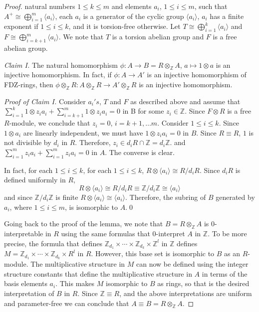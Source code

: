 \documentclass{article}
\theoremstyle{remark}
\def\Z{{\mathbb{Z}}}
\begin{document}
 \begin{proof}
 natural numbers $1\leq k \leq m$ and elements $a_i$, $1\leq i\leq m$, such that $A^+\cong \bigoplus_{i=1}^m \langle a_i\rangle$, each $a_i$ is a generator of the cyclic group $\langle a_i\rangle$, $a_i$ has a finite exponent if $1\leq i\leq k$, and it is torsion-free otherwise. Let $T\cong \bigoplus_{i=1}^k \langle a_i\rangle$ and $F\cong \bigoplus_{i=k+1}^m \langle a_i\rangle$. We note that $T$ is a torsion abelian group and $F$ is a free abelian group.

 \noindent \emph{Claim I.} The natural homomorphism $\phi:A\to B=R\otimes_\Z A$, $a\mapsto 1\otimes a$ is an injective homomorphism. In fact, if $\phi: A \to A'$ is an injective homomorphism of FDZ-rings, then $\phi\otimes_\Z R: A\otimes_\Z R\to A'\otimes_\Z R$ is an injective homomorphism.   
 
 \noindent \emph{Proof of Claim I.}  Consider $a_i's$, $T$ and $F$ as described above and assume that $\sum_{i=1}^k 1\otimes z_i a_i+ \sum_{i=k+1}^m 1\otimes z_i a_i=0$ in B for some $z_i\in \Z$. Since $F\otimes R$ is a free $R$-module, we conclude that $z_i=0$, $i=k+1, \ldots m$. Consider $1\leq i\leq k$. Since $1\otimes a_i$ are linearly independent, we must have $1\otimes z_ia_i=0$ in $B$. Since $R\equiv R$, $1$ is not divisible by $d_i$ in $R$. Therefore, $z_i\in d_iR\cap \Z=d_i\Z $. and $\sum_{i=1}^m z_i a_i+ \sum_{i=1}^m z_i a_i=0$ in $A$. The converse is clear. 
 
 
     In fact, for each $1\leq i\leq k$, for each $1\leq i\leq k$, $R\otimes \langle a_i\rangle \cong R/d_iR$.
 Since $d_iR$ is defined uniformly in $R$,
 $$R\otimes \langle a_i\rangle \cong R/d_iR \equiv \Z/d_i\Z\cong \langle a_i\rangle$$
 and since $\Z/d_i\Z$ is finite $R\otimes \langle a_i\rangle \cong \langle a_i\rangle$. Therefore, the subring of $B$ generated by $a_i$, where $1\leq i\leq m$, is isomorphic to $A$.\qed

Going back to the proof of the lemma, we note that $B=R\otimes_{\Z}A$ is 0-interpretable in $R$ using the same formulas that 0-interpret $A$ in $\Z$. To be more precise, the formula that defines $ \Z_{d_1}\times \cdots \times\Z_{d_k}\times \Z^l$ in $\Z$ defines $M=\Z_{d_1}\times \cdots \times \Z_{d_k}\times R^l$ in $R$. However, this base set is isomorphic to $B$ as an $R$-module. The multiplicative structure in $M$ can now be defined using the integer structure constants that define the multiplicative structure in $A$ in terms of the basis elements $a_i$. This makes $M$ isomorphic to $B$ as rings, so that is the desired interpretation of $B$ in $R$. Since $\Z\equiv R$, and the above interpretations are uniform and parameter-free we can conclude that $A\equiv B=R\otimes_\Z A$. \end{proof}
\end{document}
